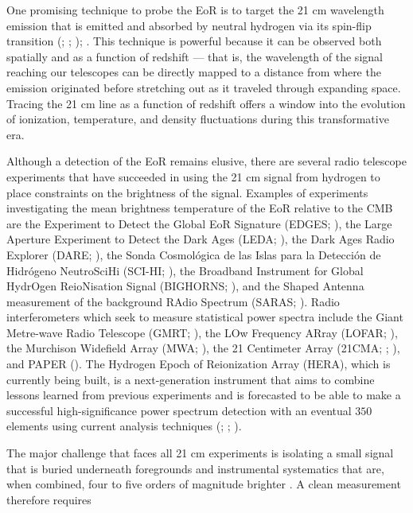 \documentclass[preprint2,numberedappendix,tighten]{aastex6}  %
\begin{document}
One promising technique to probe the EoR is to target the 21 cm wavelength emission that is emitted and absorbed by neutral hydrogen via 
its spin-flip transition (\citealt{furlanetto_et_al2006}; \citealt{morales_and_wyithe2010}; \citealt{pritchard_loeb2012}); . This technique is powerful because it can be observed both spatially and as a function of redshift --- that is, the wavelength 
of the signal reaching our telescopes can be directly mapped to a distance from where the emission originated before 
stretching out as it traveled through expanding space. Tracing the 21 cm line as a function of redshift offers a window into the 
evolution of ionization, temperature, and density fluctuations during this transformative era.

Although a detection of the EoR remains elusive, there are several radio telescope experiments that have succeeded in using 
the 21 cm signal from hydrogen to place constraints on the brightness of the signal. Examples of experiments investigating the 
mean brightness temperature of the EoR relative to the CMB are the Experiment to Detect the Global EoR Signature (EDGES; 
\citealt{bowman2010}), the Large Aperture Experiment to Detect the Dark Ages (LEDA; \citealt{greenhill_bernardi2012}), the 
Dark Ages Radio Explorer (DARE; \citealt{burns2012}), the Sonda Cosmol\'ogica de las Islas para la Detecci\'on de 
Hidr\'ogeno NeutroSciHi (SCI-HI; \citealt{voytek2014}), the Broadband Instrument for Global HydrOgen ReioNisation Signal 
(BIGHORNS; \citealt{sokolowski2015}), and the Shaped Antenna measurement of the background RAdio Spectrum (SARAS; 
\citealt{patra2015}). Radio interferometers which seek to measure statistical power spectra include the Giant Metre-wave 
Radio Telescope (GMRT; \citealt{paciga_et_al2013}), the LOw Frequency ARray (LOFAR; \citealt{van_haarlem_et_al2013}), 
the Murchison Widefield Array (MWA; \citealt{tingay_et_al2013}), the 21 Centimeter Array (21CMA; 
\citealt{peterson_et_al2004}; \citealt{wu2009}), and PAPER (\citealt{parsons_et_al2010}). The Hydrogen Epoch of 
Reionization Array (HERA), which is currently being built, is a next-generation instrument that aims to combine lessons 
learned from previous experiments and is forecasted to be able to make a successful high-significance power spectrum 
detection with an eventual $350$ elements using current analysis techniques (\citealt{pober_et_al2014}; \citealt{liu_parsons_2016}; \citealt{deboer_et_al2017}).

The major challenge that faces all 21 cm experiments is isolating a small signal that is buried underneath foregrounds and 
instrumental systematics that are, when combined, four to five orders of magnitude brighter \citep[e.g.,][]{santos_et_al2005, ali_et_al2008, deOliveiraCosta_et_al2008, jelic_et_al2008, bernardi_et_al2009, bernardi_et_al2010, ghosh_et_al2011, pober_et_al2013, dillon_et_al2014, kohn_et_al2016}. A clean measurement therefore requires 
\end{document}
